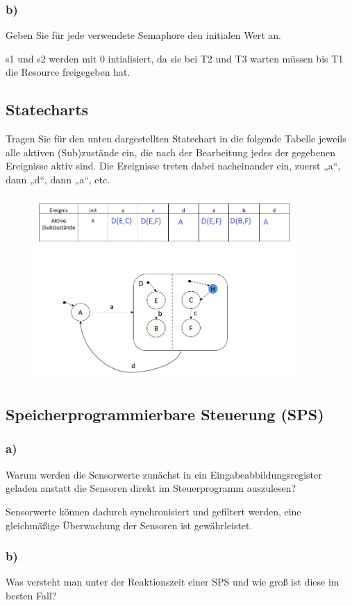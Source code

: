 \subsubsection{b)}
Geben Sie für jede verwendete Semaphore den initialen Wert an.

s1 und s2 werden mit 0 intialisiert, da sie bei T2 und T3 warten müssen bis T1 die Resource freigegeben hat.

\subsection{Statecharts}
Tragen Sie für den unten dargestellten Statechart in die folgende Tabelle jeweils alle aktiven (Sub)zustände
ein, die nach der Bearbeitung jedes der gegebenen Ereignisse aktiv sind. Die Ereignisse treten dabei
nacheinander ein, zuerst „a“, dann „d“, dann „a“, etc.

\begin{figure}[H]
  \includegraphics[width=10cm]{images/KA020222/5a.PNG}
  \centering
\end{figure}

\subsection{Speicherprogrammierbare Steuerung (SPS)}
\subsubsection{a)}
Warum werden die Sensorwerte zunächst in ein Eingabeabbildungsregister geladen anstatt die
Sensoren direkt im Steuerprogramm auszulesen?

Sensorwerte können dadurch synchronisiert und gefiltert werden, eine gleichmäßige Überwachung der Sensoren ist gewährleistet.

\subsubsection{b)}
Was versteht man unter der Reaktionszeit einer SPS und wie groß ist diese im besten Fall?

